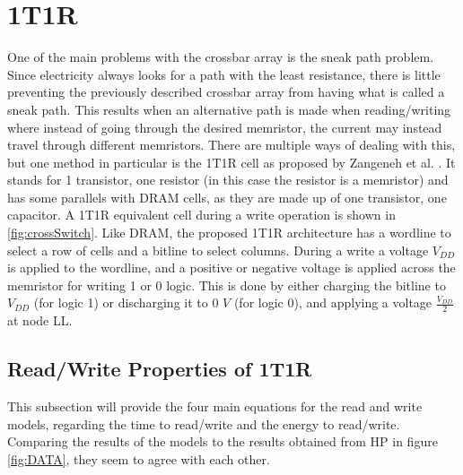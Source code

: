 \documentclass{sig-alternate}
\begin{document}
\section{1T1R}
One of the main problems with the crossbar array is the sneak path problem.  Since electricity always looks for a path with the least resistance, there is little preventing the previously described crossbar array from having what is called a sneak path.  This results when an alternative path is made when reading/writing where instead of going through the desired memristor, the current may instead travel through different memristors.  There are multiple ways of dealing with this, but one method in particular is the 1T1R cell as proposed by Zangeneh et al. \cite{Zangeneh:2012:PEM:2206781.2206786}.  It stands for 1 transistor, one resistor (in this case the resistor is a memristor) and has some parallels with DRAM cells, as they are made up of one transistor, one capacitor.  A 1T1R equivalent cell during a write operation is shown in \ref{fig:crossSwitch}.  Like DRAM, the proposed 1T1R architecture has a wordline to select a row of cells and a bitline to select columns.  During a write a voltage $V_{DD}$ is applied to the wordline, and a positive or negative voltage is applied across the memristor for writing 1 or 0 logic.  This is done by either charging the bitline to $V_{DD}$ (for logic 1) or discharging it to 0 $V$ (for logic 0), and applying a voltage $\frac {V_{DD}}{2}$ at node LL.


\subsection{Read/Write Properties of 1T1R}
This subsection will provide the four main equations for the read and write models, regarding the time to read/write and the energy to read/write.  Comparing the results of the models to the results obtained from HP in figure \ref{fig:DATA}, they seem to agree with each other.
\end{document}
